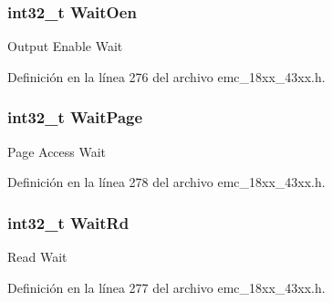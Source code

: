 \subsubsection[{\texorpdfstring{Wait\+Oen}{WaitOen}}]{\setlength{\rightskip}{0pt plus 5cm}int32\+\_\+t Wait\+Oen}\hypertarget{struct_i_p___e_m_c___s_t_a_t_i_c___c_o_n_f_i_g___t_ae9934f7f1acc736bc00c41c062f5492b}{}\label{struct_i_p___e_m_c___s_t_a_t_i_c___c_o_n_f_i_g___t_ae9934f7f1acc736bc00c41c062f5492b}
Output Enable Wait 

Definición en la línea 276 del archivo emc\+\_\+18xx\+\_\+43xx.\+h.

\subsubsection[{\texorpdfstring{Wait\+Page}{WaitPage}}]{\setlength{\rightskip}{0pt plus 5cm}int32\+\_\+t Wait\+Page}\hypertarget{struct_i_p___e_m_c___s_t_a_t_i_c___c_o_n_f_i_g___t_a821b29d36890644c704731582b54c541}{}\label{struct_i_p___e_m_c___s_t_a_t_i_c___c_o_n_f_i_g___t_a821b29d36890644c704731582b54c541}
Page Access Wait 

Definición en la línea 278 del archivo emc\+\_\+18xx\+\_\+43xx.\+h.

\subsubsection[{\texorpdfstring{Wait\+Rd}{WaitRd}}]{\setlength{\rightskip}{0pt plus 5cm}int32\+\_\+t Wait\+Rd}\hypertarget{struct_i_p___e_m_c___s_t_a_t_i_c___c_o_n_f_i_g___t_a0a4abf1deb6b835a1a3f41430f928b0c}{}\label{struct_i_p___e_m_c___s_t_a_t_i_c___c_o_n_f_i_g___t_a0a4abf1deb6b835a1a3f41430f928b0c}
Read Wait 

Definición en la línea 277 del archivo emc\+\_\+18xx\+\_\+43xx.\+h.

